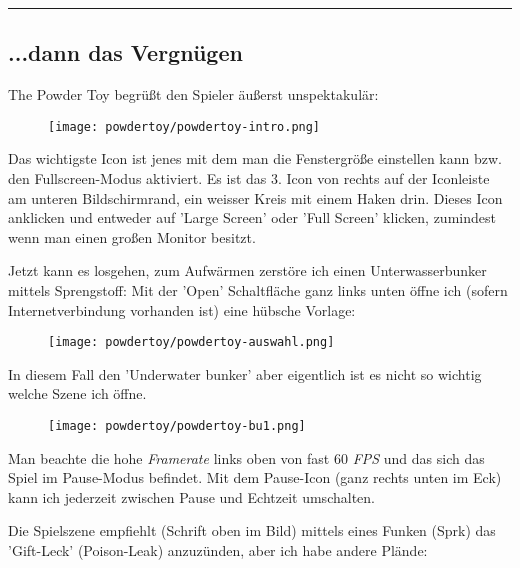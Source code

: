 \documentclass[10pt,a4paper,ngerman,twoside]{article} %
\newcommand{\SepRule}{\noindent	%
\begin{center}
\rule{250pt}{1pt} %
\end{center}
}
\begin{document}
\SepRule

\subsection*{...dann das Vergnügen}

The Powder Toy begrüßt den Spieler äußerst unspektakulär:
\begin{figure}
\texttt{[image: powdertoy/powdertoy-intro.png]}
\end{figure}

Das wichtigste Icon ist jenes mit dem man die Fenstergröße einstellen kann bzw. den Fullscreen-Modus aktiviert. Es ist das 3. Icon von rechts auf der Iconleiste am unteren Bildschirmrand, ein weisser Kreis mit einem Haken drin. Dieses Icon anklicken und entweder auf 'Large Screen' oder 'Full Screen' klicken, zumindest wenn man einen großen Monitor besitzt. 

Jetzt kann es losgehen, zum Aufwärmen zerstöre ich einen Unterwasserbunker mittels Sprengstoff:
Mit der 'Open' Schaltfläche ganz links unten öffne ich (sofern Internetverbindung vorhanden ist) eine hübsche Vorlage:
\begin{figure}
\texttt{[image: powdertoy/powdertoy-auswahl.png]}
\end{figure}

In diesem Fall den 'Underwater bunker' aber eigentlich ist es nicht so wichtig welche Szene ich öffne.
\begin{figure}
\texttt{[image: powdertoy/powdertoy-bu1.png]}
\end{figure}
Man beachte die hohe \textit{Framerate} links oben von fast 60 \textit{FPS} und das sich das Spiel im Pause-Modus befindet. Mit dem Pause-Icon (ganz rechts unten im Eck) kann ich jederzeit zwischen Pause und Echtzeit umschalten.

Die Spielszene empfiehlt (Schrift oben im Bild) mittels eines Funken (Sprk) das 'Gift-Leck' (Poison-Leak) anzuzünden, aber ich habe andere Plände:
\end{document}
